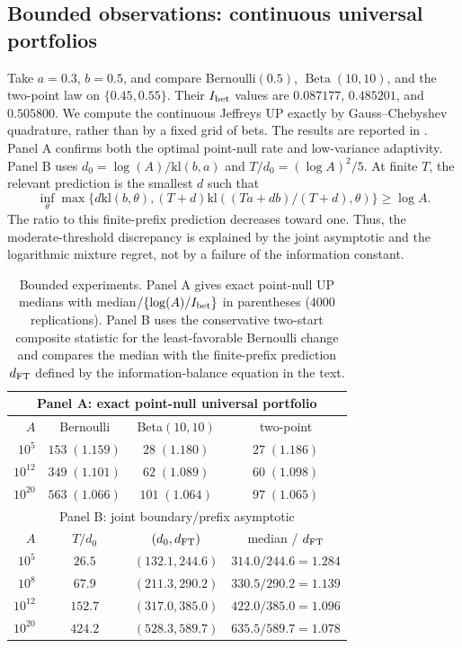 \documentclass[12pt]{article}
\theoremstyle{spaced}
\theoremstyle{remark}
\newcommand{\kl}{\mathrm{kl}}
\begin{document}
\subsection{Bounded observations: continuous universal portfolios}
Take $a=0.3$, $b=0.5$, and compare Bernoulli$(0.5)$,
$\operatorname{Beta}(10,10)$, and the two-point law on
$\{0.45,0.55\}$.  Their $I_{\rm bet}$ values are $0.087177$, $0.485201$, and
$0.505800$.  We compute the continuous Jeffreys UP exactly by
Gauss--Chebyshev quadrature, rather than by a fixed grid of bets. The results are reported in . Panel A confirms both the optimal point-null rate and low-variance adaptivity.
Panel B uses $d_0=\log(A)/\kl(b,a)$ and
$T/d_0=(\log A)^2/5$.  At finite $T$, the relevant prediction is the smallest
$d$ such that
\[
 \inf_\theta\max\{d\kl(b,\theta),(T+d)\kl((Ta+db)/(T+d),\theta)\}
 \ge\log A.
\]
The ratio to this finite-prefix prediction decreases toward one.  Thus, the
moderate-threshold discrepancy is explained by the joint asymptotic and the
logarithmic mixture regret, not by a failure of the information constant.

\begin{table}[H]
\centering
\small
\caption{Bounded experiments.  Panel A gives exact point-null UP medians with
median$/\{\log(A)/I_{\rm bet}\}$ in parentheses ($4000$ replications).  Panel B
uses the conservative two-start composite statistic for the least-favorable
Bernoulli change and compares the median with the finite-prefix prediction
$d_{\rm FT}$ defined by the information-balance equation in the text.}
\label{tab:bounded-compact}
\begin{tabular}{rccc}
\toprule
\multicolumn{4}{c}{Panel A: exact point-null universal portfolio}\\
\midrule
$A$ & Bernoulli & Beta$(10,10)$ & two-point\\
\midrule
$10^{5}$  & $153\;(1.159)$ & $28\;(1.180)$ & $27\;(1.186)$\\
$10^{12}$ & $349\;(1.101)$ & $62\;(1.089)$ & $60\;(1.098)$\\
$10^{20}$ & $563\;(1.066)$ & $101\;(1.064)$& $97\;(1.065)$\\
\midrule
\multicolumn{4}{c}{Panel B: joint boundary/prefix asymptotic}\\
\midrule
$A$ & $T/d_0$ & $(d_0,d_{\rm FT})$ & median / $d_{\rm FT}$\\
\midrule
$10^{5}$  & $26.5$  & $(132.1,244.6)$ & $314.0/244.6=1.284$\\
$10^{8}$  & $67.9$  & $(211.3,290.2)$ & $330.5/290.2=1.139$\\
$10^{12}$ & $152.7$ & $(317.0,385.0)$ & $422.0/385.0=1.096$\\
$10^{20}$ & $424.2$ & $(528.3,589.7)$ & $635.5/589.7=1.078$\\
\bottomrule
\end{tabular}
\end{table}
\end{document}
